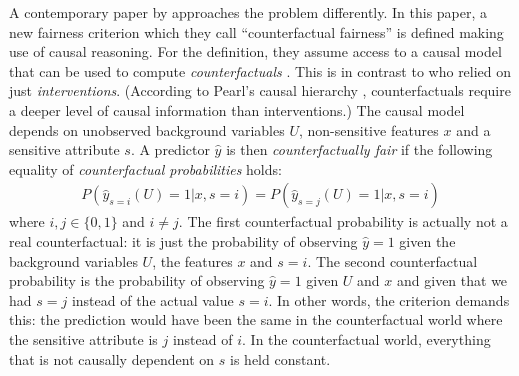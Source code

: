 
A contemporary paper by \citet{kusner2017counterfactual} approaches the problem differently. In
this paper, a new fairness criterion which they call ``counterfactual fairness'' is defined making
use of causal reasoning. For the definition, they assume access to a causal model that can be used
to compute \emph{counterfactuals} \citep[for example a structural equation
model;][]{kaplan2008structural}. This is in contrast to \citet{kilbertus2017avoiding} who relied on
just \emph{interventions}. (According to Pearl's causal hierarchy \citep{pearl2019seven},
counterfactuals require a deeper level of causal information than interventions.) The causal model
depends on unobserved background variables \(U\), non-sensitive features \(x\) and a sensitive
attribute \(s\). A predictor \(\hat{y}\) is then \emph{counterfactually fair} if the following
equality of \emph{counterfactual probabilities} holds: \begin{align}
  \label{eq:counterfactual-fairness} P(\hat{y}_{s=i}(U) = 1|x, s=i)=P(\hat{y}_{s=j}(U) = 1|x, s=i)
\end{align} where \(i, j \in \{0, 1\}\) and \(i \neq j\). The first counterfactual probability is
actually not a real counterfactual: it is just the probability of observing \(\hat{y} = 1\) given
the background variables \(U\), the features \(x\) and \(s=i\). The second counterfactual
probability is the probability of observing \(\hat{y} = 1\) given \(U\) and \(x\) and given that we
had \(s=j\) instead of the actual value \(s=i\). In other words, the criterion demands this: the
prediction would have been the same in the counterfactual world where the sensitive attribute is
\(j\) instead of \(i\). In the counterfactual world, everything that is not causally dependent on
\(s\) is held constant.

